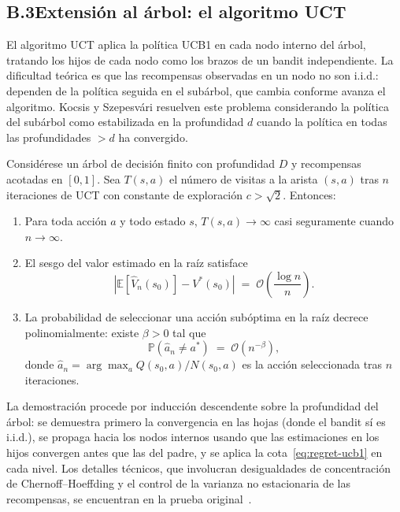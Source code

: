 \subsection*{B.3\quad Extensión al árbol: el algoritmo UCT}

El algoritmo UCT aplica la política UCB1 en cada nodo interno del árbol, tratando los hijos de cada nodo como los brazos de un bandit independiente. La dificultad teórica es que las recompensas observadas en un nodo no son i.i.d.: dependen de la política seguida en el subárbol, que cambia conforme avanza el algoritmo. Kocsis y Szepesvári resuelven este problema considerando la política del subárbol como estabilizada en la profundidad $d$ cuando la política en todas las profundidades $> d$ ha convergido.

\begin{teorema}
\label{teorema:kocsis}
Considérese un árbol de decisión finito con profundidad $D$ y recompensas acotadas en $[0,1]$. Sea $T(s, a)$ el número de visitas a la arista $(s, a)$ tras $n$ iteraciones de UCT con constante de exploración $c > \sqrt{2}$. Entonces:
\begin{enumerate}
    \item Para toda acción $a$ y todo estado $s$, $T(s, a) \to \infty$ casi seguramente cuando $n \to \infty$.
    \item El sesgo del valor estimado en la raíz satisface
    \[
        \left|\mathbb{E}[\hat{V}_n(s_0)] - V^*(s_0)\right| \;=\; \mathcal{O}\!\left(\frac{\log n}{n}\right).
    \]
    \item La probabilidad de seleccionar una acción subóptima en la raíz decrece polinomialmente: existe $\beta > 0$ tal que
    \[
        \mathbb{P}\!\left(\hat{a}_n \neq a^*\right) \;=\; \mathcal{O}\!\left(n^{-\beta}\right),
    \]
    donde $\hat{a}_n = \arg\max_a Q(s_0,a)/N(s_0,a)$ es la acción seleccionada tras $n$ iteraciones.
\end{enumerate}
\end{teorema}

La demostración procede por inducción descendente sobre la profundidad del árbol: se demuestra primero la convergencia en las hojas (donde el bandit sí es i.i.d.), se propaga hacia los nodos internos usando que las estimaciones en los hijos convergen antes que las del padre, y se aplica la cota~\eqref{eq:regret-ucb1} en cada nivel. Los detalles técnicos, que involucran desigualdades de concentración de Chernoff--Hoeffding y el control de la varianza no estacionaria de las recompensas, se encuentran en la prueba original~\cite{kocsis2006}.


